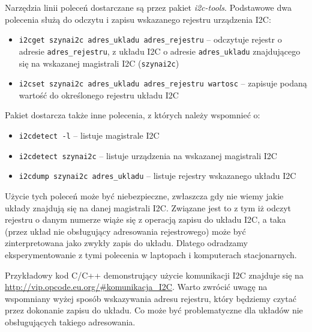 Narzędzia linii poleceń dostarczane są przez pakiet \textit{i2c-tools}. Podstawowe dwa polecenia służą do odczytu i zapisu wskazanego rejestru urządzenia I2C:
\begin{itemize}
	\item \Verb$i2cget szynai2c adres_ukladu adres_rejestru$ – odczytuje rejestr o adresie \Verb$adres_rejestru$, z układu I2C o adresie \Verb$adres_ukladu$ znajdującego się na wskazanej magistrali I2C (\Verb$szynai2c$)
	\item \Verb$i2cset szynai2c adres_ukladu adres_rejestru wartosc$ – zapisuje podaną wartość do określonego rejestru układu I2C
\end{itemize}
Pakiet dostarcza także inne polecenia, z których należy wspomnieć o:
\begin{itemize}
	\item \Verb$i2cdetect -l$ – listuje magistrale I2C
	\item \Verb$i2cdetect szynai2c$ – listuje urządzenia na wskazanej magistrali I2C
	\item \Verb$i2cdump szynai2c adres_ukladu$ – listuje rejestry wskazanego układu I2C
\end{itemize}

 Użycie tych poleceń może być niebezpieczne, zwłaszcza gdy nie wiemy jakie układy znajdują się na danej magistrali I2C.
Związane jest to z tym iż odczyt rejestru o danym numerze wiąże się z operacją zapisu do układu I2C, a taka (przez układ nie obsługujący adresowania rejestrowego) może być zinterpretowana jako zwykły zapis do układu.
Dlatego odradzamy eksperymentowanie z tymi polecenia w laptopach i komputerach stacjonarnych.



Przykładowy kod C/C++ demonstrujący użycie komunikacji I2C znajduje się na \url{http://vip.opcode.eu.org/#komunikacja_I2C}.
Warto zwrócić uwagę na wspomniany wyżej sposób wskazywania adresu rejestru, który będziemy czytać przez dokonanie zapisu do układu.
Co może być problematyczne dla układów nie obsługujących takiego adresowania.

\ifdefined\useExternalSection
	\let\useExternalSection\undefined
\else
	\let\mysection\undefined
	\let\mysubsection\undefined
\fi

